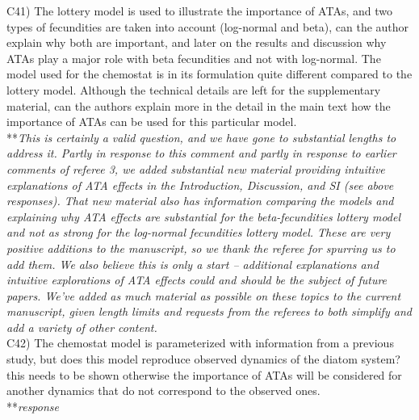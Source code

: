\documentclass[letterpaper,11pt]{article}
\begin{document}
\noindent C41) The lottery model is used to illustrate the importance of ATAs, and two types of fecundities are taken 
into account (log-normal and beta), can the author explain why both are important, and later on the results and discussion 
why ATAs play a major role with beta fecundities and not with log-normal.
The model used for the chemostat is in its formulation quite different compared to the lottery model. Although the technical
details are left for the supplementary material, can the authors explain more in the detail in the main text how the 
importance of ATAs can be used for this particular model.\\

\noindent ***\emph{This is certainly a valid question, and we have gone to substantial lengths to address it. 
Partly in response to this comment and partly in response to earlier comments of referee 3, 
we added substantial new material providing intuitive explanations of ATA effects in the Introduction,
Discussion, and SI (see above responses). That new material also has information comparing the models
and explaining why ATA effects are substantial for the beta-fecundities lottery model and not as strong
for the log-normal fecundities lottery model. These are very positive additions to the manuscript, so we 
thank the referee for spurring us to add them. We also believe this is only a start -- additional explanations and intuitive 
explorations of ATA effects could and should be the subject of future papers. We've added as much material 
as possible on these topics to the current manuscript, given length limits and
requests from the referees to both simplify and add a variety of other content.} \\

\noindent C42) The chemostat model is parameterized with information from a previous study, but does this model reproduce observed dynamics of the diatom system? this needs to be shown otherwise the importance of ATAs will be considered for another dynamics that do not correspond to the observed ones. \\

\noindent ***\emph{response} \\
\end{document}
